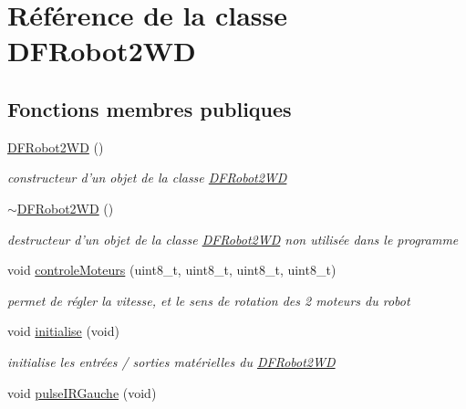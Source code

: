 \hypertarget{class_d_f_robot2_w_d}{\section{Référence de la classe D\-F\-Robot2\-W\-D}
\label{class_d_f_robot2_w_d}
}
\subsection*{Fonctions membres publiques}
\begin{DoxyCompactItemize}
\item 
\hyperlink{class_d_f_robot2_w_d_a8c1e6ff7fb5536da4cdbe735216f280d}{D\-F\-Robot2\-W\-D} ()
\begin{DoxyCompactList}\small\item\em constructeur d'un objet de la classe \hyperlink{class_d_f_robot2_w_d}{D\-F\-Robot2\-W\-D} \end{DoxyCompactList}\item 
\hypertarget{class_d_f_robot2_w_d_a93ae9e94148fc92238311aeae7e6ce51}{\hyperlink{class_d_f_robot2_w_d_a93ae9e94148fc92238311aeae7e6ce51}{$\sim$\-D\-F\-Robot2\-W\-D} ()}\label{class_d_f_robot2_w_d_a93ae9e94148fc92238311aeae7e6ce51}

\begin{DoxyCompactList}\small\item\em destructeur d'un objet de la classe \hyperlink{class_d_f_robot2_w_d}{D\-F\-Robot2\-W\-D} non utilisée dans le programme \end{DoxyCompactList}\item 
void \hyperlink{class_d_f_robot2_w_d_a8ef0540ce25d496f0b7241fd65eb9be8}{controle\-Moteurs} (uint8\-\_\-t, uint8\-\_\-t, uint8\-\_\-t, uint8\-\_\-t)
\begin{DoxyCompactList}\small\item\em permet de régler la vitesse, et le sens de rotation des 2 moteurs du robot \end{DoxyCompactList}\item 
void \hyperlink{class_d_f_robot2_w_d_abb0e83fb8a8c0d1b24478ecf4635e4e6}{initialise} (void)
\begin{DoxyCompactList}\small\item\em initialise les entrées / sorties matérielles du \hyperlink{class_d_f_robot2_w_d}{D\-F\-Robot2\-W\-D} \end{DoxyCompactList}\item 
\hypertarget{class_d_f_robot2_w_d_a0e61bccfdb5ef356661f3e23564b4b08}{void \hyperlink{class_d_f_robot2_w_d_a0e61bccfdb5ef356661f3e23564b4b08}{pulse\-I\-R\-Gauche} (void)}\label{class_d_f_robot2_w_d_a0e61bccfdb5ef356661f3e23564b4b08}


\end{DoxyCompactItemize}
